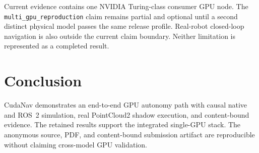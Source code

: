 \documentclass[conference]{IEEEtran}
\begin{document}
Current evidence contains one NVIDIA Turing-class consumer GPU node. The
\texttt{multi\_gpu\_reproduction} claim remains partial and optional until a
second distinct physical model passes the same release profile.
Real-robot closed-loop navigation is also outside the current claim boundary.
Neither limitation is represented as a completed result.

\section{Conclusion}
CudaNav demonstrates an end-to-end GPU autonomy path with causal native and
ROS~2 simulation, real PointCloud2 shadow execution, and content-bound
evidence. The retained results support the integrated single-GPU stack. The
anonymous source, PDF, and content-bound submission artifact are reproducible
without claiming cross-model GPU validation.



\end{document}
